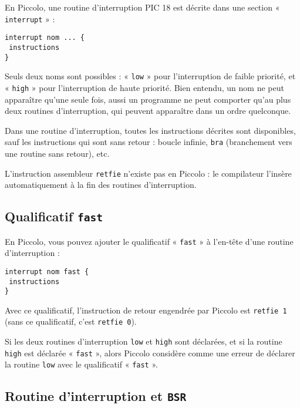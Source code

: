 En Piccolo, une routine d’interruption PIC 18 est décrite dans une section « \texttt{interrupt} » :

\begin{lstlisting}[language=piccolo]
interrupt nom ... {
 instructions
}
\end{lstlisting}

Seuls deux noms sont possibles : « \texttt{low} » pour l’interruption de faible priorité, et « \texttt{high} » pour l’interruption de haute priorité. Bien entendu, un nom ne peut apparaître qu’une seule fois, aussi un programme ne peut comporter qu'au plus deux routines d'interruption, qui peuvent apparaître dans un ordre quelconque.

Dans une routine d'interruption, toutes les instructions décrites sont disponibles, sauf les instructions qui sont sans retour : boucle infinie, \texttt{bra} (branchement vers une routine sans retour), etc.

L’instruction assembleur \texttt{retfie} n’existe pas en Piccolo : le compilateur l’insère automatiquement à la fin des routines d’interruption.



\subsection{Qualificatif \texttt{fast}}

En Piccolo, vous pouvez ajouter le qualificatif « \texttt{fast} » à l’en-tête d’une routine d’interruption :

\begin{lstlisting}[language=piccolo]
interrupt nom fast {
 instructions
}
\end{lstlisting}

Avec ce qualificatif, l’instruction de retour engendrée par Piccolo est \texttt{retfie 1} (sans ce qualificatif, c’est \texttt{retfie 0}).

Si les deux routines d’interruption \texttt{low} et \texttt{high} sont déclarées, et si la routine \texttt{high} est déclarée « \texttt{fast} », alors Piccolo considère comme une erreur de déclarer la routine \texttt{low} avec le qualificatif « \texttt{fast} ».






\subsection{Routine d'interruption et \texttt{BSR}}

